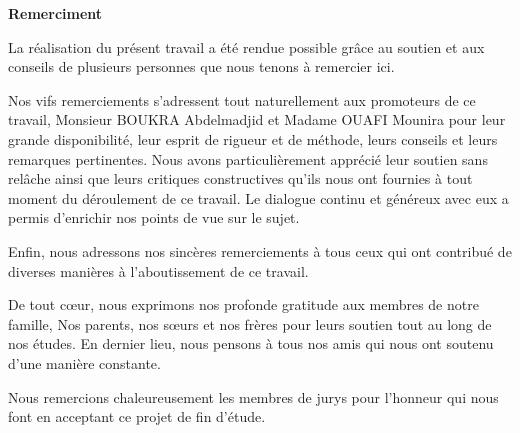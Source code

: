 
\thispagestyle{empty}

\begin{center}
	\LARGE\textbf{Remerciment}
\end{center}

\Large{

La réalisation du présent travail a été rendue possible grâce au soutien et aux conseils de plusieurs personnes que nous tenons à remercier ici. 

Nos vifs remerciements s’adressent tout naturellement aux promoteurs de ce travail, Monsieur BOUKRA Abdelmadjid et Madame OUAFI Mounira pour leur grande disponibilité, leur esprit de rigueur et de méthode, leurs conseils et leurs remarques pertinentes. Nous avons particulièrement apprécié leur soutien sans relâche ainsi que leurs critiques constructives qu’ils nous ont fournies à tout moment du déroulement de ce travail. Le dialogue continu et généreux avec eux a permis d’enrichir nos points de vue sur le sujet. 
    	
Enfin, nous adressons nos sincères remerciements à tous ceux qui ont contribué de diverses manières à l'aboutissement de ce travail. 

De tout cœur, nous exprimons nos profonde gratitude aux membres de notre famille, Nos parents, nos sœurs et nos frères pour leurs soutien tout au long de nos études. En dernier lieu, nous pensons à tous nos amis qui nous ont soutenu d’une manière constante. 

Nous remercions chaleureusement les membres de jurys pour l’honneur qui nous font en acceptant ce projet de fin d’étude.

}

